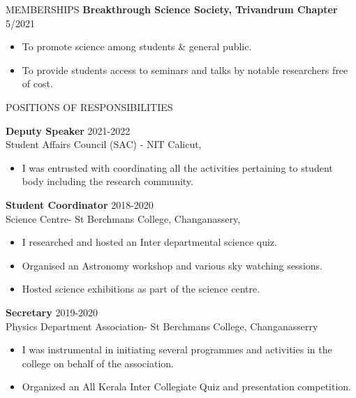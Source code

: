 \documentclass{resume} %
\begin{document}
\begin{rSection}{MEMBERSHIPS}
\textbf{Breakthrough Science Society, Trivandrum Chapter} \hfill 5/2021
\begin{itemize}[noitemsep,topsep=-0.2cm]
	\itemsep-0.05cm
	\item To promote science among students \& general public.
	\item To provide students access to seminars and talks by notable researchers free of cost.
\end{itemize}
\end{rSection}

\begin{rSection}{POSITIONS OF RESPONSIBILITIES}
	
	\textbf{Deputy Speaker } \hfill 2021-2022\\
	Student Affairs Council (SAC) - NIT Calicut,
	\begin{itemize}[noitemsep,topsep=-0.2cm]
		\itemsep-0.25cm
		\item I was entrusted with coordinating all the activities pertaining to student body including the research community. 
	\end{itemize}
	
	\textbf{Student Coordinator  } \hfill 2018-2020\\
	Science Centre- St Berchmans College, Changanassery,
	\begin{itemize}[noitemsep,topsep=-0.2cm]
		\itemsep-0.05cm
		\item I researched and hosted an Inter departmental science quiz. 
		\item Organised an Astronomy workshop and various sky watching sessions. 
		\item Hosted science exhibitions as part of the science centre. 
	\end{itemize}
	
	\textbf{Secretary} \hfill 2019-2020\\
	Physics Department Association- St Berchmans College, Changanasserry 
	\begin{itemize}[noitemsep,topsep=-0.2cm]
		\itemsep-0.05cm
		\item I was instrumental in initiating several programmes and activities in the college on behalf of the association. 
		\item Organized an All Kerala Inter Collegiate Quiz and presentation competition. 
	\end{itemize}


\end{rSection}
\end{document}
